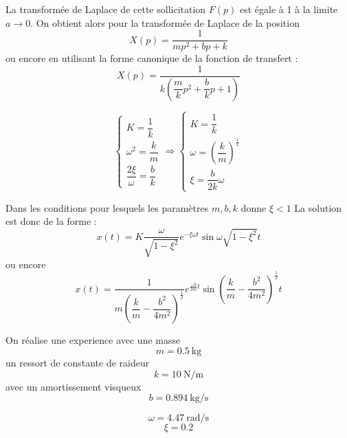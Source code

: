 La transformée de Laplace de cette sollicitation $F(p)$ est égale à 1 à 
la limite $a\to0$. On obtient alors pour la transformée de Laplace de la position
\[
    X(p)=\dfrac{1}{mp^2+bp+k}
\]
ou encore en utilisant la forme canonique de la fonction de transfert :
\[
    X(p)=\dfrac{1}{k\left(\dfrac{m}{k}p^2+\dfrac{b}{k}p+1\right)}
\]


\[
    \begin{cases}
        K=\dfrac{1}{k}\\[2em]
        \omega^2=\dfrac{k}{m}\\[2em]
        \dfrac{2\xi}{\omega}=\dfrac{b}{k}
    \end{cases}\Rightarrow
    \begin{cases}
        K=\dfrac{1}{k}\\[2em]
        \omega=\left(\dfrac{k}{m}\right)^{\frac{1}{2}}\\[2em]
        \xi=\dfrac{b}{2k}\omega
    \end{cases}
\]



Dans les conditions pour lesquels les paramètres $m, b ,k$ donne $\xi<1$ 
La solution est donc de la forme :
\[
    x(t)=K\dfrac{\omega}{\sqrt{1-\xi^2}}                                                                                                     e^{-\xi\omega t}\sin{\omega\sqrt{1-\xi^2} t} 
\]
ou encore 
\[
    x(t)=\dfrac{1}{m\left(\dfrac{k}{m}-\dfrac{b^2}{4m^2}\right)^{\frac{1}{2}}}e^{\frac{-b}{2m}t}\sin{\left(\dfrac{k}{m}-\dfrac{b^2}{4m^2}\right)^{\frac{1}{2}}t}
\]

\begin{figure}[!h]
    \centering
    
\end{figure}
On réalise une experience avec une masse
\[
    m=\SI{0.5}{\kilogram}
\]
un ressort de constante de raideur
\[
    k=\SI{10}{\newton\per\meter}
\]
avec un amortissement visqueux 
\[
    b=\SI{0.894}{\kilogram\per\second}
\]


\[
    \omega=\SI{4.47}{\radian\per\second}
\]
\[
    \xi=0.2
\]

